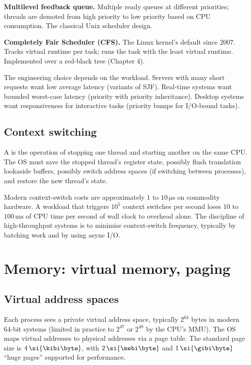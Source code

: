 \textbf{Multilevel feedback queue.} Multiple ready queues at different priorities; threads are demoted from high priority to low priority based on CPU consumption. The classical Unix scheduler design.

\textbf{Completely Fair Scheduler (CFS).} The Linux kernel's default since 2007. Tracks virtual runtime per task; runs the task with the least virtual runtime. Implemented over a red-black tree (Chapter 4).

The engineering choice depends on the workload. Servers with many short requests want low average latency (variants of SJF). Real-time systems want bounded worst-case latency (priority with priority inheritance). Desktop systems want responsiveness for interactive tasks (priority bumps for I/O-bound tasks).

\subsection{Context switching}

A  is the operation of stopping one thread and starting another on the same CPU. The OS must save the stopped thread's register state, possibly flush translation lookaside buffers, possibly switch address spaces (if switching between processes), and restore the new thread's state.

Modern context-switch costs are approximately $1$ to $10\,\si{\micro\second}$ on commodity hardware. A workload that triggers $10^5$ context switches per second loses $10$ to $100\,\si{\milli\second}$ of CPU time per second of wall clock to overhead alone. The discipline of high-throughput systems is to minimise context-switch frequency, typically by batching work and by using async I/O.

\section{Memory: virtual memory, paging}

\subsection{Virtual address spaces}

Each process sees a private virtual address space, typically $2^{64}$ bytes in modern 64-bit systems (limited in practice to $2^{47}$ or $2^{48}$ by the CPU's MMU). The OS maps virtual addresses to physical addresses via a page table. The standard page size is $4\,\si{\kibi\byte}$, with $2\,\si{\mebi\byte}$ and $1\,\si{\gibi\byte}$ ``huge pages'' supported for performance.

